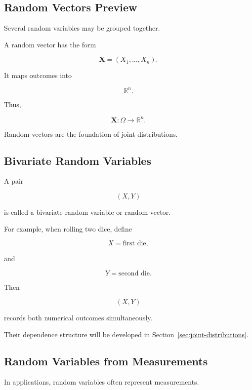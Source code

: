 \subsection{Random Vectors Preview}
\label{subsec:random-vectors-preview}

Several random variables may be grouped together.

A random vector has the form

\[
\boxed{
\mathbf{X}
=
(X_1,\ldots,X_n).
}
\]

It maps outcomes into

\[
\mathbb{R}^n.
\]

Thus,

\[
\boxed{
\mathbf{X}:\Omega\to\mathbb{R}^n.
}
\]

Random vectors are the foundation of joint distributions.

\subsection{Bivariate Random Variables}
\label{subsec:bivariate-random-variables}

A pair

\[
(X,Y)
\]

is called a bivariate random variable or random vector.

For example, when rolling two dice, define

\[
X
=
\text{first die},
\]

and

\[
Y
=
\text{second die}.
\]

Then

\[
(X,Y)
\]

records both numerical outcomes simultaneously.

Their dependence structure will be developed in
Section~\ref{sec:joint-distributions}.

\subsection{Random Variables from Measurements}
\label{subsec:rv-measurements}

In applications, random variables often represent measurements.

